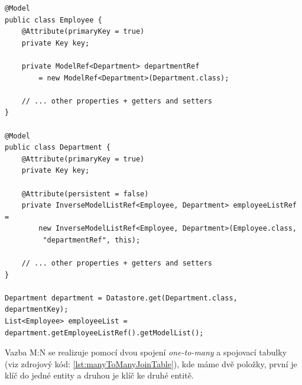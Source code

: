 \begin{lstlisting}[caption={Získání entit ze vztahu many-to-many},label=lst:manyToManyGetEntity,belowcaptionskip=0.4cm]
@Model
public class Employee {
	@Attribute(primaryKey = true)
	private Key key;	
	
	private ModelRef<Department> departmentRef 
		= new ModelRef<Department>(Department.class);
	
	// ... other properties + getters and setters
}

@Model
public class Department {
	@Attribute(primaryKey = true)
	private Key key;
	
	@Attribute(persistent = false)
	private InverseModelListRef<Employee, Department> employeeListRef =
		new InverseModelListRef<Employee, Department>(Employee.class,
		 "departmentRef", this);

	// ... other properties + getters and setters
}

Department department = Datastore.get(Department.class, departmentKey);
List<Employee> employeeList = department.getEmployeeListRef().getModelList();
\end{lstlisting}

Vazba M:N se realizuje pomocí dvou spojení \emph{one-to-many} a spojovací tabulky (viz zdrojový kód: \ref{lst:manyToManyJoinTable}), kde máme dvě položky, první je klíč do jedné entity a druhou je klíč ke druhé entitě. 


